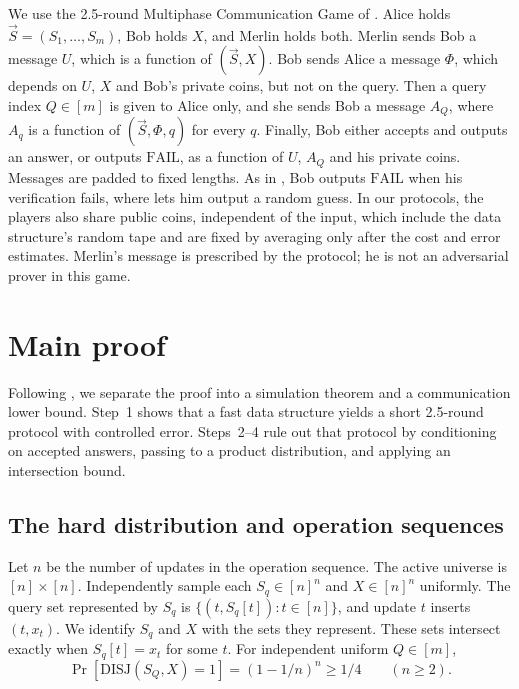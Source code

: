 \documentclass[11pt]{article}
\newcounter{Protocol}
\theoremstyle{plain}
\newcommand{\DISJ}{\mathrm{DISJ}}
\newcommand{\FAIL}{\mathrm{FAIL}}
\newcommand{\vS}{\vec{S}}
\begin{document}
We use the 2.5-round Multiphase Communication Game of \cite[Protocol~3]{ko_omega_2026}. Alice holds $\vS=(S_1,\dots,S_m)$, Bob holds $X$, and Merlin holds both. Merlin sends Bob a message $U$, which is a function of $(\vS,X)$. Bob sends Alice a message $\Phi$, which depends on $U$, $X$ and Bob's private coins, but not on the query. Then a query index $Q\in[m]$ is given to Alice only, and she sends Bob a message $A_Q$, where $A_q$ is a function of $(\vS,\Phi,q)$ for every $q$. Finally, Bob either accepts and outputs an answer, or outputs $\FAIL$, as a function of $U$, $A_Q$ and his private coins. Messages are padded to fixed lengths. As in \cite{ko_omegalog_2026}, Bob outputs $\FAIL$ when his verification fails, where \cite{ko_omega_2026} lets him output a random guess. In our protocols, the players also share public coins, independent of the input, which include the data structure's random tape and are fixed by averaging only after the cost and error estimates. Merlin's message is prescribed by the protocol; he is not an adversarial prover in this game.

\section{Main proof}\label{sec:proof}

Following \cite{ko_omega_2026,ko_omegalog_2026}, we separate the proof
into a simulation theorem and a communication lower bound.
Step~1 shows that a fast data structure yields a short
2.5-round protocol with controlled error. Steps~2--4 rule out that protocol
by conditioning on accepted answers, passing to a product distribution,
and applying an intersection bound.

\subsection{The hard distribution and operation sequences}\label{sec:dist}
Let $n$ be the number of updates in the operation sequence.
The active universe is $[n]\times[n]$.
Independently sample each $S_q\in[n]^n$ and $X\in[n]^n$ uniformly.
The query set represented by $S_q$ is
$\{(t,S_q[t]):t\in[n]\}$, and update $t$ inserts $(t,x_t)$.
We identify $S_q$ and $X$ with the sets they represent. These sets
intersect exactly when $S_q[t]=x_t$ for some $t$.
For independent uniform $Q\in[m]$,
\begin{equation}\label{eq:yes}
 \Pr[\DISJ(S_Q,X)=1]=(1-1/n)^n\ge1/4\qquad(n\ge2).
\end{equation}
\end{document}
